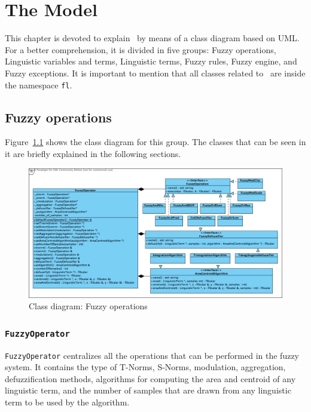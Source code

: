 \chapter{The Model}
	This chapter is devoted to explain \fl\ by means of a class diagram based on UML. For a better comprehension, it is divided in five groups: Fuzzy operations, Linguistic variables and terms, Linguistic terms, Fuzzy rules, Fuzzy engine, and Fuzzy exceptions. It is important to mention that all classes related to \fl\ are inside the namespace \texttt{fl}.
	
	\section{Fuzzy operations}
		Figure~\ref{f:fuzzy-ops} shows the class diagram for this group. The classes that can be seen in it are briefly explained in the following sections.
		
		\begin{landscape}
			

		\begin{figure}[ht]
			\centering
			\includegraphics[scale=0.7]{./figures/fuzzy-ops.png}
			\caption{Class diagram: Fuzzy operations}
			\label{f:fuzzy-ops}
		\end{figure}
				\end{landscape}
		
		\subsection{\texttt{FuzzyOperator}}
			\texttt{FuzzyOperator} centralizes all the operations that can be performed in the fuzzy system. It contains the type of T-Norms, S-Norms, modulation, aggregation, defuzzification methods, algorithms for computing the area and centroid of any linguistic term, and the number of samples that are drawn from any linguistic term to be used by the algorithm. 
			
